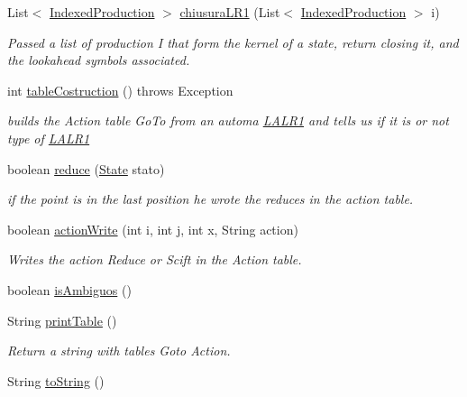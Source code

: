 \begin{DoxyCompactItemize}
List$<$ \hyperlink{classcontext_free_1_1parser_1_1_indexed_production}{Indexed\-Production} $>$ \hyperlink{classcontext_free_1_1parser_1_1_l_a_l_r1_ac711dbbc2be25d15c1a8aade7579e94e}{chiusura\-L\-R1} (List$<$ \hyperlink{classcontext_free_1_1parser_1_1_indexed_production}{Indexed\-Production} $>$ i)
\begin{DoxyCompactList}\small\item\em Passed a list of production I that form the kernel of a state, return closing it, and the lookahead symbols associated. \end{DoxyCompactList}\item 
int \hyperlink{classcontext_free_1_1parser_1_1_l_a_l_r1_a79576626b3b59b832faecc986b293b36}{table\-Costruction} ()  throws Exception
\begin{DoxyCompactList}\small\item\em builds the Action table Go\-To from an automa \hyperlink{classcontext_free_1_1parser_1_1_l_a_l_r1}{L\-A\-L\-R1} and tells us if it is or not type of \hyperlink{classcontext_free_1_1parser_1_1_l_a_l_r1}{L\-A\-L\-R1} \end{DoxyCompactList}\item 
boolean \hyperlink{classcontext_free_1_1parser_1_1_l_a_l_r1_a2281981b3043c0150c1b3d3967572b1f}{reduce} (\hyperlink{classcontext_free_1_1parser_1_1_state}{State} stato)
\begin{DoxyCompactList}\small\item\em if the point is in the last position he wrote the reduces in the action table. \end{DoxyCompactList}\item 
boolean \hyperlink{classcontext_free_1_1parser_1_1_l_a_l_r1_a7379103379c94e377daca0022b28771e}{action\-Write} (int i, int j, int x, String action)
\begin{DoxyCompactList}\small\item\em Writes the action Reduce or Scift in the Action table. \end{DoxyCompactList}\item 
boolean \hyperlink{classcontext_free_1_1parser_1_1_l_a_l_r1_a9c19be71fc16e04343eb3c23b6eac9da}{is\-Ambiguos} ()
\item 
String \hyperlink{classcontext_free_1_1parser_1_1_l_a_l_r1_ad7628eb817b4a8efff71f6e22cc1659f}{print\-Table} ()
\begin{DoxyCompactList}\small\item\em Return a string with tables Goto Action. \end{DoxyCompactList}\item 
String \hyperlink{classcontext_free_1_1parser_1_1_l_a_l_r1_afa3cc07b08ecbe69486105beb311eb69}{to\-String} ()
\end{DoxyCompactItemize}
